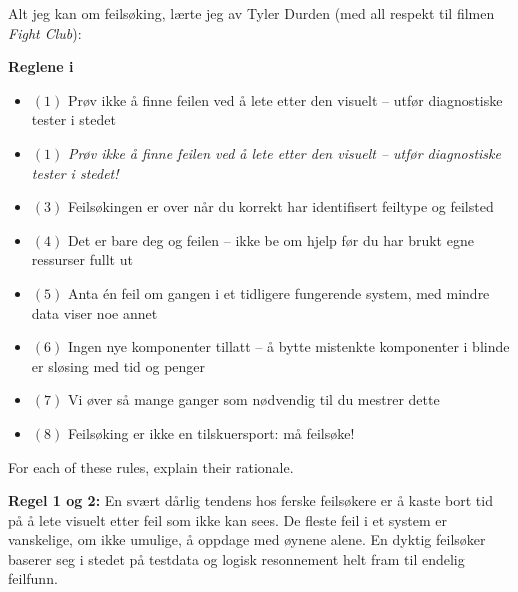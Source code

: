 

Alt jeg kan om feilsøking, lærte jeg av Tyler Durden (med all respekt til filmen {\it Fight Club}):

\vskip 10pt

\centerline{\bf Reglene i }

\begin{itemize}
\item{$(1)$} Prøv ikke å finne feilen ved å lete etter den visuelt -- utfør diagnostiske tester i stedet
\vskip 10pt
\item{$(1)$} {\it Prøv ikke å finne feilen ved å lete etter den visuelt -- utfør diagnostiske tester i stedet!}
\vskip 10pt
\item{$(3)$} Feilsøkingen er over når du korrekt har identifisert feiltype og feilsted
\vskip 10pt
\item{$(4)$} Det er bare deg og feilen -- ikke be om hjelp før du har brukt egne ressurser fullt ut
\vskip 10pt
\item{$(5)$} Anta én feil om gangen i et tidligere fungerende system, med mindre data viser noe annet
\vskip 10pt
\item{$(6)$} Ingen nye komponenter tillatt -- å bytte mistenkte komponenter i blinde er sløsing med tid og penger
\vskip 10pt
\item{$(7)$} Vi øver så mange ganger som nødvendig til du mestrer dette
\vskip 10pt
\item{$(8)$} Feilsøking er ikke en tilskuersport:  må feilsøke!
\end{itemize}

\vskip 10pt

For each of these rules, explain their rationale.







{\bf Regel 1 og 2:} En svært dårlig tendens hos ferske feilsøkere er å kaste bort tid på å lete visuelt etter feil som ikke kan sees. De fleste feil i et system er vanskelige, om ikke umulige, å oppdage med øynene alene. En dyktig feilsøker baserer seg i stedet på testdata og logisk resonnement helt fram til endelig feilfunn.

